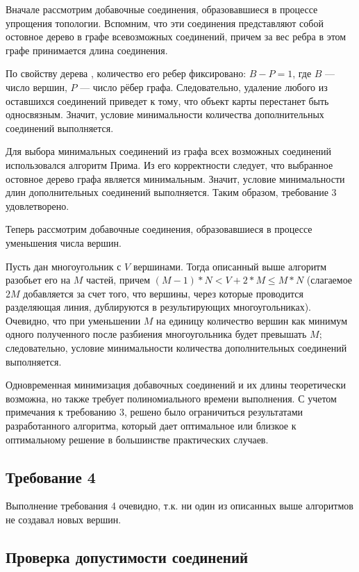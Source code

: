 Вначале рассмотрим добавочные соединения, образовавшиеся в процессе упрощения топологии. Вспомним, что эти соединения представляют собой остовное дерево в графе всевозможных соединений, причем за вес ребра в этом графе принимается длина соединения.

По свойству дерева \cite{__2010}, количество его ребер фиксировано: $B-P=1$, где $B$ — число вершин, $P$ — число рёбер графа. Следовательно, удаление любого из оставшихся соединений приведет к тому, что объект карты перестанет быть односвязным. Значит, условие минимальности количества дополнительных соединений выполняется.

Для выбора минимальных соединений из графа всех возможных соединений использовался алгоритм Прима. Из его корректности \cite{prim_shortest_1957} следует, что выбранное остовное дерево графа является минимальным. Значит, условие минимальности длин дополнительных соединений выполняется. Таким образом, требование 3 удовлетворено.

Теперь рассмотрим добавочные соединения, образовавшиеся в процессе уменьшения числа вершин.

Пусть дан многоугольник с $V$ вершинами. Тогда описанный выше алгоритм разобьет его на $M$ частей, причем $(M-1)*N < V+2*M \leq M*N$ (слагаемое $2M$ добавляется за счет того, что вершины, через которые проводится разделяющая линия, дублируются в результирующих многоугольниках). Очевидно, что при уменьшении $M$ на единицу количество вершин как минимум одного полученного после разбиения многоугольника будет превышать $M$; следовательно, условие минимальности количества дополнительных соединений выполняется.

Одновременная минимизация добавочных соединений и их длины теоретически возможна, но также требует полиномиального времени выполнения. С учетом примечания к требованию 3, решено было ограничиться результатами разработанного алгоритма, который дает оптимальное или близкое к оптимальному решение в большинстве практических случаев.

\subsection{Требование 4}
\label{}

Выполнение требования 4 очевидно, т.к. ни один из описанных выше алгоритмов не создавал новых вершин.

\subsection{Проверка допустимости соединений}
\label{}

